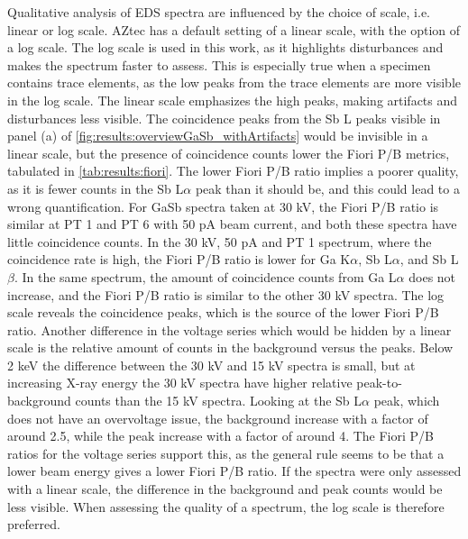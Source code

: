 Qualitative analysis of EDS spectra are influenced by the choice of scale, i.e. linear or log scale.
AZtec has a default setting of a linear scale, with the option of a log scale.
The log scale is used in this work, as it highlights disturbances and makes the spectrum faster to assess.
This is especially true when a specimen contains trace elements, as the low peaks from the trace elements are more visible in the log scale.
The linear scale emphasizes the high peaks, making artifacts and disturbances less visible.
The coincidence peaks from the Sb L peaks visible in panel (a) of \cref{fig:results:overviewGaSb_withArtifacts} would be invisible in a linear scale, but the presence of coincidence counts lower the Fiori P/B metrics, tabulated in \cref{tab:results:fiori}.
The lower Fiori P/B ratio implies a poorer quality, as it is fewer counts in the Sb L$\alpha$ peak than it should be, and this could lead to a wrong quantification.
For GaSb spectra taken at 30 kV, the Fiori P/B ratio is similar at PT 1 and PT 6 with 50 pA beam current, and both these spectra have little coincidence counts.
In the 30 kV, 50 pA and PT 1 spectrum, where the coincidence rate is high, the Fiori P/B ratio is lower for Ga K$\alpha$, Sb L$\alpha$, and Sb L$\beta$.
In the same spectrum, the amount of coincidence counts from Ga L$\alpha$ does not increase, and the Fiori P/B ratio is similar to the other 30 kV spectra.
The log scale reveals the coincidence peaks, which is the source of the lower Fiori P/B ratio.
Another difference in the voltage series which would be hidden by a linear scale is the relative amount of counts in the background versus the peaks.
Below 2 keV the difference between the 30 kV and 15 kV spectra is small, but at increasing X-ray energy the 30 kV spectra have higher relative peak-to-background counts than the 15 kV spectra.
Looking at the Sb L$\alpha$ peak, which does not have an overvoltage issue, the background increase with a factor of around 2.5, while the peak increase with a factor of around 4.
The Fiori P/B ratios for the voltage series support this, as the general rule seems to be that a lower beam energy gives a lower Fiori P/B ratio.
If the spectra were only assessed with a linear scale, the difference in the background and peak counts would be less visible.
When assessing the quality of a spectrum, the log scale is therefore preferred.


